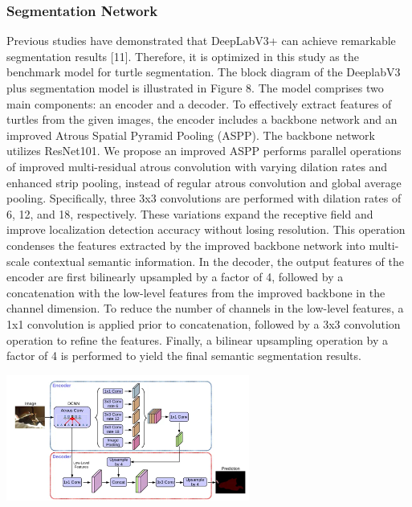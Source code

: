 \documentclass[conference]{IEEEtran}
\begin{document}
\subsubsection{Segmentation Network}
Previous studies have demonstrated that DeepLabV3+ can achieve remarkable segmentation results [11]. Therefore, it is optimized in this study as the benchmark model for turtle segmentation. The block diagram of the DeeplabV3 plus segmentation model is illustrated in Figure 8. The model comprises two main components: an encoder and a decoder.
To effectively extract features of turtles from the given images, the encoder includes a backbone network and an improved Atrous Spatial Pyramid Pooling (ASPP). The backbone network utilizes ResNet101. We propose an improved ASPP performs parallel operations of improved multi-residual atrous convolution with varying dilation rates and enhanced strip pooling, instead of regular atrous convolution and global average pooling. Specifically, three 3x3 convolutions are performed with dilation rates of 6, 12, and 18, respectively. These variations expand the receptive field and improve localization detection accuracy without losing resolution. This operation condenses the features extracted by the improved backbone network into multi-scale contextual semantic information. 
In the decoder, the output features of the encoder are first bilinearly upsampled by a factor of 4, followed by a concatenation with the low-level features from the improved backbone in the channel dimension. To reduce the number of channels in the low-level features, a 1x1 convolution is applied prior to concatenation, followed by a 3x3 convolution operation to refine the features. Finally, a bilinear upsampling operation by a factor of 4 is performed to yield the final semantic segmentation results.
\centerline{\includegraphics[width=80mm,scale=0.5]{group/Picture8.png}}
\end{document}
